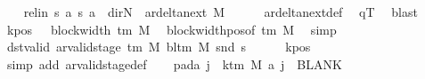 \begin{isabellebody}
\ \ \isamarkupfalse%
\ rel{\isacharunderscore}{\kern0pt}in{\isacharcolon}{\kern0pt}\ {\isachardoublequoteopen}{\isacharparenleft}{\kern0pt}{\isacharquery}{\kern0pt}s{\isacharcomma}{\kern0pt}\ {\isacharquery}{\kern0pt}a{\isacharcomma}{\kern0pt}\ {\isacharquery}{\kern0pt}s{\isacharprime}{\kern0pt}{\isacharcomma}{\kern0pt}\ {\isacharquery}{\kern0pt}a{\isacharcomma}{\kern0pt}\ {\isacharparenleft}{\kern0pt}{\isasymlambda}{\isacharunderscore}{\kern0pt}{\isachardot}{\kern0pt}\ dir{\isachardot}{\kern0pt}N{\isacharparenright}{\kern0pt}{\isacharparenright}{\kern0pt}\ {\isasymin}\ ar{\isacharunderscore}{\kern0pt}delta{\isacharunderscore}{\kern0pt}next\ M{\isachardoublequoteclose}\isanewline
\ \ \ \ \isamarkupfalse%
\ ar{\isacharunderscore}{\kern0pt}delta{\isacharunderscore}{\kern0pt}next{\isacharunderscore}{\kern0pt}def\ \isamarkupfalse%
\ qT\ \isamarkupfalse%
\ blast\isanewline
\ \ \isamarkupfalse%
\ kpos{\isacharcolon}{\kern0pt}\ {\isachardoublequoteopen}{}\ {\isacharless}{\kern0pt}\ block{\isacharunderscore}{\kern0pt}width\ {\isacharparenleft}{\kern0pt}{\isasymGamma}{\isacharunderscore}{\kern0pt}tm\ M{\isacharparenright}{\kern0pt}{\isachardoublequoteclose}\ \isamarkupfalse%
\ block{\isacharunderscore}{\kern0pt}width{\isacharunderscore}{\kern0pt}pos{\isacharbrackleft}{\kern0pt}of\ {\isachardoublequoteopen}{\isasymGamma}{\isacharunderscore}{\kern0pt}tm\ M{\isachardoublequoteclose}{\isacharbrackright}{\kern0pt}\ \isamarkupfalse%
\ simp\isanewline
\ \ \isamarkupfalse%
\ dst{\isacharunderscore}{\kern0pt}valid{\isacharcolon}{\kern0pt}\ {\isachardoublequoteopen}ar{\isacharunderscore}{\kern0pt}valid{\isacharunderscore}{\kern0pt}stage\ {\isacharparenleft}{\kern0pt}{\isasymGamma}{\isacharunderscore}{\kern0pt}tm\ M{\isacharparenright}{\kern0pt}\ {\isacharparenleft}{\kern0pt}bl{\isacharunderscore}{\kern0pt}tm\ M{\isacharparenright}{\kern0pt}\ {\isacharparenleft}{\kern0pt}snd\ {\isacharquery}{\kern0pt}s{\isacharprime}{\kern0pt}{\isacharparenright}{\kern0pt}{\isachardoublequoteclose}\isanewline
\ \ \ \ \isamarkupfalse%
\ kpos\ \isamarkupfalse%
\ {\isacharparenleft}{\kern0pt}simp\ add{\isacharcolon}{\kern0pt}\ ar{\isacharunderscore}{\kern0pt}valid{\isacharunderscore}{\kern0pt}stage{\isacharunderscore}{\kern0pt}def{\isacharparenright}{\kern0pt}\isanewline
\ \ \isamarkupfalse%
\ pad{\isacharunderscore}{\kern0pt}a{\isacharcolon}{\kern0pt}\ {\isachardoublequoteopen}{\isasymforall}j\ {\isasymge}\ k{\isacharunderscore}{\kern0pt}tm\ M{\isachardot}{\kern0pt}\ {\isacharquery}{\kern0pt}a\ j\ {\isacharequal}{\kern0pt}\ BLANK{}{\isachardoublequoteclose}\ \isamarkupfalse%

\end{isabellebody}
